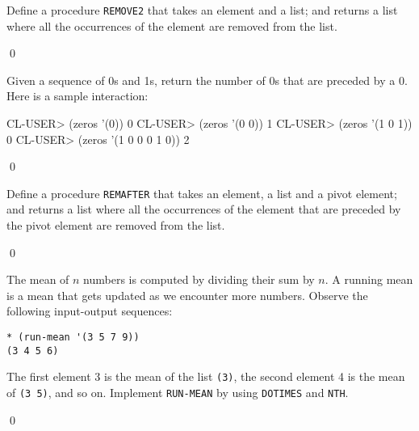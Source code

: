 \documentclass[a4paper,11pt]{article}
\begin{document}
\begin{uexercise}
Define a procedure \Verb+REMOVE2+ that takes an element and a list; and returns a list where all the occurrences of the element are removed from the list.

\qed
\end{uexercise}

\begin{uexercise}[*]
\label{exprecbyzero}
Given a sequence of 0s and 1s, return the number of 0s that
are preceded by a 0. Here is a sample interaction:

\begin{lispcode}
CL-USER> (zeros '(0))
0
CL-USER> (zeros '(0 0))
1
CL-USER> (zeros '(1 0 1))
0
CL-USER> (zeros '(1 0 0 0 1 0))
2
\end{lispcode}

\qed
\end{uexercise}

\begin{uexercise}
Define a procedure \Verb+REMAFTER+  that takes an element, a list and
a pivot element; and returns a list where all the occurrences of the
element that are preceded by the pivot element are removed from the list.

\qed
\end{uexercise}

% 

\begin{uexercise}
The mean of $n$ numbers is computed by dividing their sum by $n$. A running mean is a mean that gets updated as we encounter more numbers. Observe the following input-output sequences:

\begin{Verbatim}
* (run-mean '(3 5 7 9))
(3 4 5 6)
\end{Verbatim}

The first element 3 is the mean of the list \Verb+(3)+, the second element 4 is the mean of \Verb+(3 5)+, and so on. Implement \Verb+RUN-MEAN+ by using \Verb+DOTIMES+ and \Verb+NTH+.

\qed
\end{uexercise}
\end{document}
